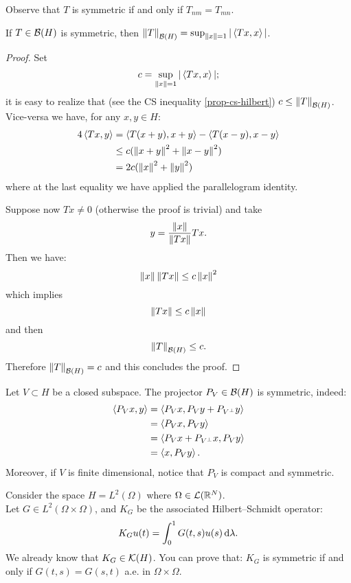 Observe that $T$ is symmetric if and only if $T_{nm}= T_{mn}$.

\begin{prop}
	If $T \in \mathcal B(H)$ is symmetric, then $\left\lVert T\right\rVert_{\mathcal B(H)} = \sup_{\left\lVert x\right\rVert=1}|\left\langle Tx,x\right\rangle |$.
\end{prop}

\begin{proof}
	Set 
	$$
	c 
	= \sup_{\left\lVert x\right\rVert =1}|\left\langle Tx,x\right\rangle |
	;
	$$ 
	it is easy to realize that (see the CS inequality \vref{prop-cs-hilbert}) $c \leq \left\lVert T\right\rVert_{\mathcal B(H)}$.\\
	Vice-versa we have, for any $x,y \in H$:
	\begin{align*}
		4\left\langle Tx,y\right\rangle
		&= \left\langle T(x+y), x+y\right\rangle  - \left\langle T(x-y), x-y\right\rangle \\
		&\leq c(\left\lVert x+y\right\rVert^2+\left\lVert x-y\right\rVert^2)\\
		& = 2c(\left\lVert x\right\rVert^2+\left\lVert y\right\rVert^2)
	\end{align*}
	where at the last equality we have applied the parallelogram identity. 
	
	Suppose now $Tx \neq 0$ (otherwise the proof is trivial) and take 
	$$
	y 
	= \frac{\left\lVert x\right\rVert}{\left\lVert Tx\right\rVert}Tx
	.
	$$
	Then we have:
	$$
	\left\lVert x\right\rVert \left\lVert Tx\right\rVert 
	\leq c \left\lVert x\right\rVert^2
	$$ 
	which implies
	$$
	\left\lVert Tx\right\rVert 
	\leq c \left\lVert x\right\rVert
	$$
	and then
	$$ 
	\left\lVert T\right\rVert_{\mathcal B(H)} 
	\leq c
	.
	$$
	Therefore $\left\lVert T\right\rVert_{\mathcal B(H)}=c$ and this concludes the proof.
\end{proof}


\begin{exam}
	Let $V \subset H$ be a closed subspace.
	The projector $P_V \in \mathcal B(H)$ is symmetric, indeed:
	\begin{align*}
		\left\langle P_Vx, y\right\rangle
		&= \left\langle P_Vx, P_Vy+ P_{V^\perp}y\right\rangle  \\
		&= \left\langle P_Vx, P_Vy\right\rangle \\
		&= \left\langle P_V x+ P_{V^\perp} x, P_V y\right\rangle \\ 
		&= \left\langle x, P_V y\right\rangle.
	\end{align*}
	Moreover, if $V$ is finite dimensional, notice that $P_V$ is compact and symmetric.
\end{exam}
\begin{exam}
	Consider the space $H=L^2(\Omega)$ where $\Omega \in \mathcal L(\mathbb R^N)$.\\
	Let $G\in L^2(\Omega \times \Omega)$, and $K_G$ be the associated Hilbert--Schmidt operator: 
	$$
	K_G u(t) 
	= \int_0^1 G(t,s) u(s) \, \mathrm d \lambda
	.
	$$
	We already know that $K_G \in \mathcal K(H)$. You can prove that: $K_{G}$ is symmetric if and only if $G(t,s) = G(s,t)$ a.e. in $\Omega \times \Omega$.
\end{exam}

